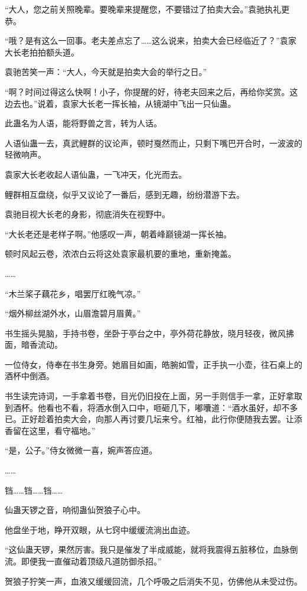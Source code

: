 \begin{this_body}
“大人，您之前关照晚辈。要晚辈来提醒您，不要错过了拍卖大会。”袁驰执礼更恭。

“哦？是有这么一回事。老夫差点忘了……这么说来，拍卖大会已经临近了？”袁家大长老拍拍额头道。

袁驰苦笑一声：“大人，今天就是拍卖大会的举行之日。”

“啊？时间过得这么快啊！小子，你提醒的好，待老夫回来之后，再给你奖赏。这边去也。”说着，袁家大长老一挥长袖，从镜湖中飞出一只仙蛊。

此蛊名为人语，能将野兽之言，转为人话。

人语仙蛊一去，真武鲤群的议论声，顿时戛然而止，只剩下嘴巴开合时，一波波的轻微响声。

袁家大长老收起人语仙蛊，一飞冲天，化光而去。

鲤群相互盘绕，似乎又议论了一番后，感到无趣，纷纷潜游下去。

袁驰目视大长老的身影，彻底消失在视野中。

“大长老还是老样子啊。”他感叹一声，朝着峰巅镜湖一挥长袖。

顿时风起云卷，浓浓白云将这处袁家最机要的重地，重新掩盖。

……

“木兰桨子藕花乡，唱罢厅红晚气凉。”

“烟外柳丝湖外水，山眉澹碧月眉黄。”

书生摇头晃脑，手持书卷，坐卧于亭台之中，亭外荷花静放，晓月轻夜，微风拂面，暗香流动。

一位侍女，侍奉在书生身旁。她眉目如画，皓腕如雪，正手执一小壶，往石桌上的酒杯中倒酒。

书生读完诗词，一手拿着书卷，目光仍旧投在上面，另一手则信手一拿，正好拿取到酒杯。他看也不看，将酒水倒入口中，咂砸几下，嘟囔道：“酒水虽好，却不多已。正好趁着拍卖大会，向那人再讨要几坛来兮。红袖，此行你便随我去罢。让添香留在这里，看守福地。”

“是，公子。”侍女微微一喜，婉声答应道。

……

铛……铛……铛……

仙蛊天锣之音，响彻蛊仙贺狼子心中。

他盘坐于地，睁开双眼，从七窍中缓缓流淌出血迹。

“这仙蛊天锣，果然厉害。我只是催发了半成威能，就将我震得五脏移位，血脉倒流。即便我一直催动着顶级凡道防御杀招。”

贺狼子狞笑一声，血液又缓缓回流，几个呼吸之后消失不见，仿佛他从未受过伤。


\end{this_body}
